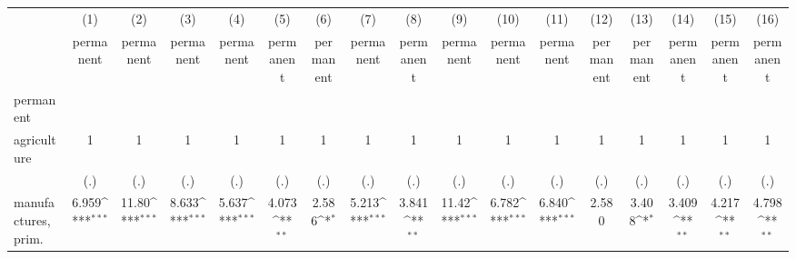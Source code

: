 {
\def\sym#1{\ifmmode^{#1}\else\(^{#1}\)\fi}
\begin{tabular}{l*{16}{c}}
\hline\hline
                    &\multicolumn{1}{c}{(1)}&\multicolumn{1}{c}{(2)}&\multicolumn{1}{c}{(3)}&\multicolumn{1}{c}{(4)}&\multicolumn{1}{c}{(5)}&\multicolumn{1}{c}{(6)}&\multicolumn{1}{c}{(7)}&\multicolumn{1}{c}{(8)}&\multicolumn{1}{c}{(9)}&\multicolumn{1}{c}{(10)}&\multicolumn{1}{c}{(11)}&\multicolumn{1}{c}{(12)}&\multicolumn{1}{c}{(13)}&\multicolumn{1}{c}{(14)}&\multicolumn{1}{c}{(15)}&\multicolumn{1}{c}{(16)}\\
                    &\multicolumn{1}{c}{permanent}&\multicolumn{1}{c}{permanent}&\multicolumn{1}{c}{permanent}&\multicolumn{1}{c}{permanent}&\multicolumn{1}{c}{permanent}&\multicolumn{1}{c}{permanent}&\multicolumn{1}{c}{permanent}&\multicolumn{1}{c}{permanent}&\multicolumn{1}{c}{permanent}&\multicolumn{1}{c}{permanent}&\multicolumn{1}{c}{permanent}&\multicolumn{1}{c}{permanent}&\multicolumn{1}{c}{permanent}&\multicolumn{1}{c}{permanent}&\multicolumn{1}{c}{permanent}&\multicolumn{1}{c}{permanent}\\
\hline
permanent           &                     &                     &                     &                     &                     &                     &                     &                     &                     &                     &                     &                     &                     &                     &                     &                     \\
agriculture         &           1         &           1         &           1         &           1         &           1         &           1         &           1         &           1         &           1         &           1         &           1         &           1         &           1         &           1         &           1         &           1         \\
                    &         (.)         &         (.)         &         (.)         &         (.)         &         (.)         &         (.)         &         (.)         &         (.)         &         (.)         &         (.)         &         (.)         &         (.)         &         (.)         &         (.)         &         (.)         &         (.)         \\
[1em]
manufactures, prim. &       6.959\sym{***}&       11.80\sym{***}&       8.633\sym{***}&       5.637\sym{***}&       4.073\sym{**} &       2.586\sym{*}  &       5.213\sym{***}&       3.841\sym{**} &       11.42\sym{***}&       6.782\sym{***}&       6.840\sym{***}&       2.580         &       3.408\sym{*}  &       3.409\sym{**} &       4.217\sym{**} &       4.798\sym{**} \\

\end{tabular}}
